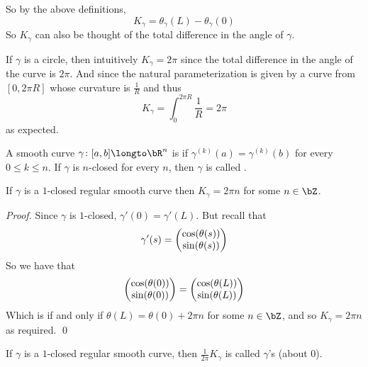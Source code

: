 So by the above definitions,
\[ K_\gamma = \theta_\gamma(L) - \theta_\gamma(0) \]
So $K_\gamma$ can also be thought of the total difference in the angle of $\gamma$.

\begin{exam*}

    If $\gamma$ is a circle, then intuitively $K_\gamma=2\pi$ since the total difference in the angle of the curve is $2\pi$.
    And since the natural parameterization is given by a curve from $[0,2\pi R]$ whose curvature is $\frac1R$ and thus
    \[ K_\gamma = \int_0^{2\pi R}\frac1R = 2\pi \]
    as expected.

\end{exam*}

\begin{defn*}

    A smooth curve $\gamma\colon[a,b]\longto\bR^n$ is  if $\gamma^{(k)}(a)=\gamma^{(k)}(b)$ for every $0\leq k\leq n$.
    If $\gamma$ is $n$-closed for every $n$, then $\gamma$ is called .

\end{defn*}

\begin{prop*}

    If $\gamma$ is a $1$-closed regular smooth curve then $K_\gamma=2\pi n$ for some $n\in\bZ$.

\end{prop*}

\begin{proof}

    Since $\gamma$ is $1$-closed, $\gamma'(0)=\gamma'(L)$.
    But recall that
    \[ \gamma'(s) = \begin{pmatrix}\cos(\theta(s))\\\sin(\theta(s))\end{pmatrix} \]
    So we have that
    \[ \begin{pmatrix}\cos(\theta(0))\\\sin(\theta(0))\end{pmatrix} = \begin{pmatrix}\cos(\theta(L))\\\sin(\theta(L))\end{pmatrix} \]
    Which is if and only if $\theta(L)=\theta(0)+2\pi n$ for some $n\in\bZ$, and so $K_\gamma=2\pi n$ as required.
    \qed

\end{proof}

\begin{defn*}

    If $\gamma$ is a $1$-closed regular smooth curve, then $\frac1{2\pi}K_\gamma$ is called $\gamma$'s  (about $0$).

\end{defn*}

